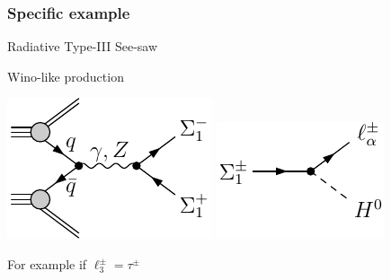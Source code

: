 \documentclass[%
xcolor=dvipsnames,table%
]{beamer}
\begin{document}
\begin{frame}
  \frametitle{Specific example}
  Radiative Type-III See-saw

Wino-like production 

\includegraphics[scale=1]{rsiii_prod}\hspace{1cm}
\includegraphics[scale=1]{rsiii_decay}

For example if $\ell_3^{\pm}=\tau^{\pm}$

\end{frame}
\end{document}
